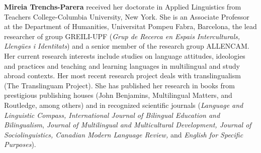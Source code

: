 \textbf{Mireia Trenchs-Parera} received her doctorate in Applied {Linguistics} from Teachers College-Columbia University, New York. She is an Associate Professor at the Department of Humanities, Universitat Pompeu Fabra, Barcelona, the lead researcher of group GREILI-UPF (\textit{Grup de Recerca en Espais Interculturals, Llengües i Identitats}) and a senior member of the research group ALLENCAM. Her current research interests include studies on language attitudes, ideologies and practices and teaching and learning languages in {multilingual} and study abroad contexts.  Her most recent research project deals with translingualism (The Translinguam Project). She has published her research in books from prestigious publishing houses (John Benjamins, Multilingual Matters, and Routledge, among others) and in recognized scientific journals (\textit{Language and Linguistic Compass, International Journal of Bilingual Education and Bilingualism}, \textit{Journal of Multilingual and Multicultural Development, Journal of Sociolinguistics, Canadian Modern Language Review,} and \textit{{English} for Specific Purposes}). 